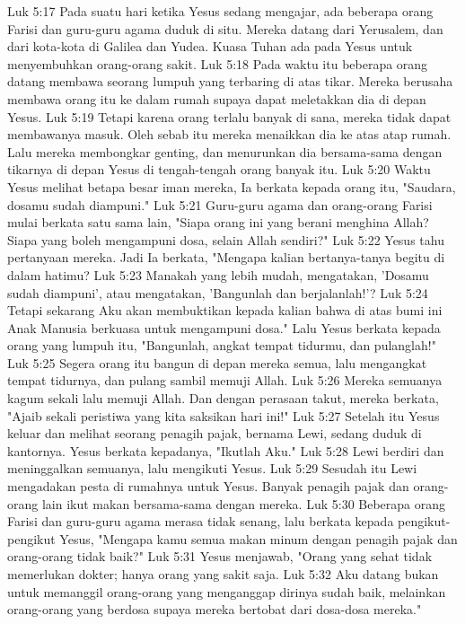 Luk 5:17  Pada suatu hari ketika Yesus sedang mengajar, ada beberapa orang Farisi dan guru-guru agama duduk di situ. Mereka datang dari Yerusalem, dan dari kota-kota di Galilea dan Yudea. Kuasa Tuhan ada pada Yesus untuk menyembuhkan orang-orang sakit.
Luk 5:18  Pada waktu itu beberapa orang datang membawa seorang lumpuh yang terbaring di atas tikar. Mereka berusaha membawa orang itu ke dalam rumah supaya dapat meletakkan dia di depan Yesus.
Luk 5:19  Tetapi karena orang terlalu banyak di sana, mereka tidak dapat membawanya masuk. Oleh sebab itu mereka menaikkan dia ke atas atap rumah. Lalu mereka membongkar genting, dan menurunkan dia bersama-sama dengan tikarnya di depan Yesus di tengah-tengah orang banyak itu.
Luk 5:20  Waktu Yesus melihat betapa besar iman mereka, Ia berkata kepada orang itu, "Saudara, dosamu sudah diampuni."
Luk 5:21  Guru-guru agama dan orang-orang Farisi mulai berkata satu sama lain, "Siapa orang ini yang berani menghina Allah? Siapa yang boleh mengampuni dosa, selain Allah sendiri?"
Luk 5:22  Yesus tahu pertanyaan mereka. Jadi Ia berkata, "Mengapa kalian bertanya-tanya begitu di dalam hatimu?
Luk 5:23  Manakah yang lebih mudah, mengatakan, 'Dosamu sudah diampuni', atau mengatakan, 'Bangunlah dan berjalanlah!'?
Luk 5:24  Tetapi sekarang Aku akan membuktikan kepada kalian bahwa di atas bumi ini Anak Manusia berkuasa untuk mengampuni dosa." Lalu Yesus berkata kepada orang yang lumpuh itu, "Bangunlah, angkat tempat tidurmu, dan pulanglah!"
Luk 5:25  Segera orang itu bangun di depan mereka semua, lalu mengangkat tempat tidurnya, dan pulang sambil memuji Allah.
Luk 5:26  Mereka semuanya kagum sekali lalu memuji Allah. Dan dengan perasaan takut, mereka berkata, "Ajaib sekali peristiwa yang kita saksikan hari ini!"
Luk 5:27  Setelah itu Yesus keluar dan melihat seorang penagih pajak, bernama Lewi, sedang duduk di kantornya. Yesus berkata kepadanya, "Ikutlah Aku."
Luk 5:28  Lewi berdiri dan meninggalkan semuanya, lalu mengikuti Yesus.
Luk 5:29  Sesudah itu Lewi mengadakan pesta di rumahnya untuk Yesus. Banyak penagih pajak dan orang-orang lain ikut makan bersama-sama dengan mereka.
Luk 5:30  Beberapa orang Farisi dan guru-guru agama merasa tidak senang, lalu berkata kepada pengikut-pengikut Yesus, "Mengapa kamu semua makan minum dengan penagih pajak dan orang-orang tidak baik?"
Luk 5:31  Yesus menjawab, "Orang yang sehat tidak memerlukan dokter; hanya orang yang sakit saja.
Luk 5:32  Aku datang bukan untuk memanggil orang-orang yang menganggap dirinya sudah baik, melainkan orang-orang yang berdosa supaya mereka bertobat dari dosa-dosa mereka."
